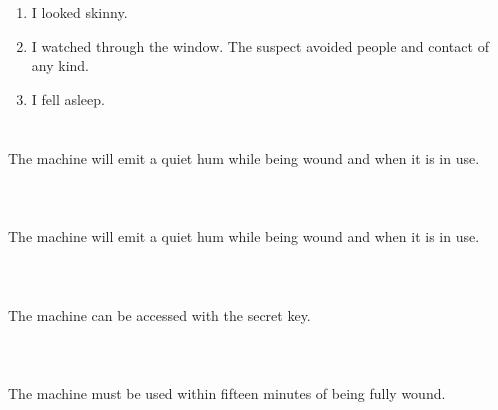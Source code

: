 \documentclass{article}
\begin{document}
    \newpage
    
    \section{}
    
    \begin{enumerate}
    
    \item I looked skinny.\\
    
    \item I watched through the window. The suspect avoided people and contact of any kind.\\
    
    \item I fell asleep.\\
    
    \end{enumerate}
     
    \newpage
    
    \section{}
    The machine will emit a quiet hum while being wound and when it is in use.\\\\ 
    \newpage
    
    \section{}
    The machine will emit a quiet hum while being wound and when it is in use.\\\\ 
    \newpage
    
    \section{}
    The machine can be accessed with the secret key.\\\\ 
    \newpage
    
    \section{}
    The machine must be used within fifteen minutes of being fully wound.\\\\ 
    \newpage
    
\end{document}
